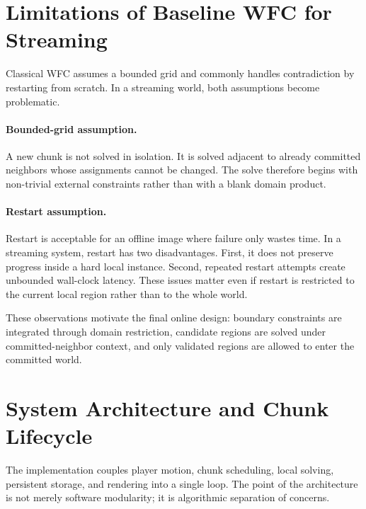 \documentclass[12pt,a4paper]{report}
\begin{document}
\section{Limitations of Baseline WFC for Streaming}
Classical WFC assumes a bounded grid and commonly handles contradiction by restarting from scratch. In a streaming world, both assumptions become problematic.

\paragraph{Bounded-grid assumption.} A new chunk is not solved in isolation. It is solved adjacent to already committed neighbors whose assignments cannot be changed. The solve therefore begins with non-trivial external constraints rather than with a blank domain product.

\paragraph{Restart assumption.} Restart is acceptable for an offline image where failure only wastes time. In a streaming system, restart has two disadvantages. First, it does not preserve progress inside a hard local instance. Second, repeated restart attempts create unbounded wall-clock latency. These issues matter even if restart is restricted to the current local region rather than to the whole world.

These observations motivate the final online design: boundary constraints are integrated through domain restriction, candidate regions are solved under committed-neighbor context, and only validated regions are allowed to enter the committed world.

\section{System Architecture and Chunk Lifecycle}
The implementation couples player motion, chunk scheduling, local solving, persistent storage, and rendering into a single loop. The point of the architecture is not merely software modularity; it is algorithmic separation of concerns.
\end{document}
